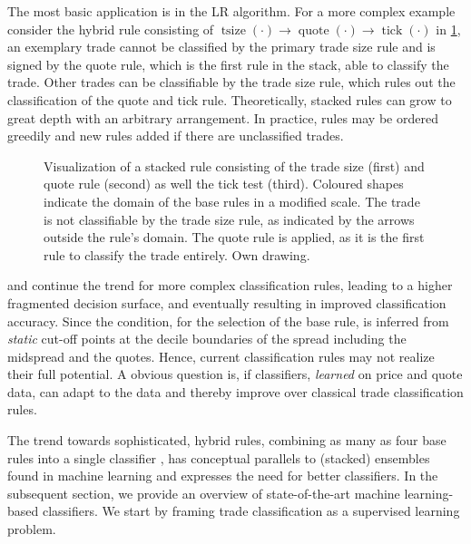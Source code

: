 The most basic application is in the \gls{LR} algorithm. For a more complex example consider the hybrid rule consisting of $\operatorname{tsize}(\cdot) \to \operatorname{quote}(\cdot) \to \operatorname{tick}(\cdot)$ in \cref{fig:stacking-algo}, an exemplary trade cannot be classified by the primary trade size rule and is signed by the quote rule, which is the first rule in the stack, able to classify the trade. Other trades can be classifiable by the trade size rule, which rules out the classification of the quote and tick rule. Theoretically, stacked rules can grow to great depth with an arbitrary arrangement. In practice, rules may be ordered greedily and new rules added if there are unclassified trades.

\begin{figure}[ht!]
  \centering
  
  \caption[Visualization Of A Stacked Rule]{Visualization of a stacked rule consisting of the trade size (first) and quote rule (second) as well the tick test (third). Coloured shapes indicate the domain of the base rules in a modified scale. The trade is not classifiable by the trade size rule, as indicated by the arrows outside the rule's domain. The quote rule is applied, as it is the first rule to classify the trade entirely. Own drawing.}
  \label{fig:stacking-algo}
\end{figure}

\textcite[][3811]{chakrabartyTradeClassificationAlgorithms2007} and \textcite[][18]{grauerOptionTradeClassification2022} continue the trend for more complex classification rules, leading to a higher fragmented decision surface, and eventually resulting in improved classification accuracy. Since the condition, for the selection of the base rule, is inferred from \emph{static} cut-off points at the decile boundaries of the spread including the midspread and the quotes. Hence, current classification rules may not realize their full potential. A obvious question is, if classifiers, \emph{learned} on price and quote data, can adapt to the data and thereby improve over classical trade classification rules.

The trend towards sophisticated, hybrid rules, combining as many as four base rules into a single classifier \autocite[cp.][18]{grauerOptionTradeClassification2022}, has conceptual parallels to (stacked) ensembles found in machine learning and expresses the need for better classifiers. In the subsequent section, we provide an overview of state-of-the-art machine learning-based classifiers. We start by framing trade classification as a supervised learning problem.

